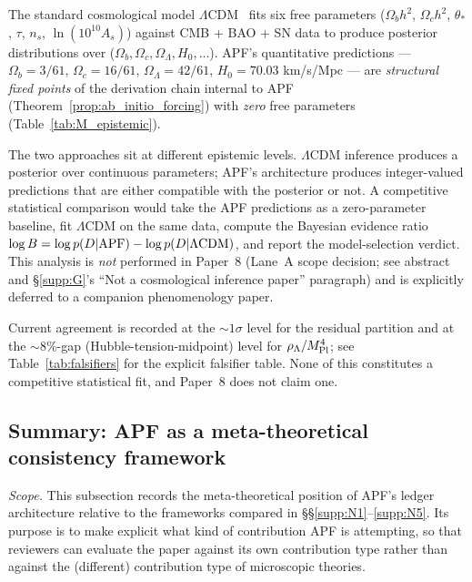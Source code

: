 \documentclass[11pt]{article}
\theoremstyle{plain}
\theoremstyle{definition}
\theoremstyle{remark}
\newcommand{\Mpl}{M_{\rm Pl}}
\begin{document}
The standard cosmological model $\Lambda$CDM~\cite{Planck2018} fits six free parameters ($\Omega_b h^2$, $\Omega_c h^2$, $\theta_*$, $\tau$, $n_s$, $\ln(10^{10} A_s)$) against CMB + BAO + SN data to produce posterior distributions over ($\Omega_b, \Omega_c, \Omega_\Lambda, H_0, \ldots$).  APF's quantitative predictions --- $\Omega_b = 3/61$, $\Omega_c = 16/61$, $\Omega_\Lambda = 42/61$, $H_0 = 70.03$ km/s/Mpc --- are \emph{structural fixed points} of the derivation chain internal to APF (Theorem~\ref{prop:ab_initio_forcing}) with \emph{zero} free parameters (Table~\ref{tab:M_epistemic}).

The two approaches sit at different epistemic levels.  $\Lambda$CDM inference produces a posterior over continuous parameters; APF's architecture produces integer-valued predictions that are either compatible with the posterior or not.  A competitive statistical comparison would take the APF predictions as a zero-parameter baseline, fit $\Lambda$CDM on the same data, compute the Bayesian evidence ratio $\log B = \log p(D | {\rm APF}) - \log p(D | \Lambda{\rm CDM})$, and report the model-selection verdict.  This analysis is \emph{not} performed in Paper~8 (Lane~A scope decision; see abstract and §\ref{supp:G}'s ``Not a cosmological inference paper'' paragraph) and is explicitly deferred to a companion phenomenology paper.

Current agreement is recorded at the $\sim 1\sigma$ level for the residual partition and at the $\sim 8\%$-gap (Hubble-tension-midpoint) level for $\rho_\Lambda / \Mpl^4$; see Table~\ref{tab:falsifiers} for the explicit falsifier table.  None of this constitutes a competitive statistical fit, and Paper~8 does not claim one.

\bigskip

\subsection{Summary: APF as a meta-theoretical consistency framework}\label{supp:N6}

\noindent\textit{Scope.}  This subsection records the meta-theoretical position of APF's ledger architecture relative to the frameworks compared in \S\S\ref{supp:N1}--\ref{supp:N5}.  Its purpose is to make explicit what kind of contribution APF is attempting, so that reviewers can evaluate the paper against its own contribution type rather than against the (different) contribution type of microscopic theories.
\end{document}
